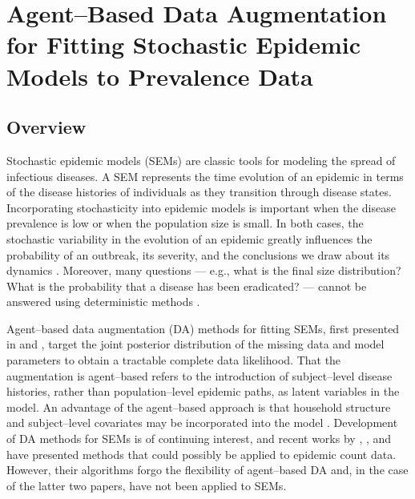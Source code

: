 \chapter{Agent--Based Data Augmentation for Fitting Stochastic Epidemic Models to Prevalence Data}
\label{chap:bda_for_fitting_sems_to_prevalence_data}

\section{Overview}
\label{sec:bda_overview}

Stochastic epidemic models (SEMs) are classic tools for modeling the spread of infectious diseases. A SEM represents the time evolution of an epidemic in terms of the disease histories of individuals as they transition through disease states. Incorporating stochasticity into epidemic models is important when the disease prevalence is low or when the population size is small. In both cases, the stochastic variability in the evolution of an epidemic greatly influences the probability of an outbreak, its severity, and the conclusions we draw about its dynamics \cite{allen2008introduction,keeling2008}. Moreover, many questions --- e.g., what is the final size distribution? What is the probability that a disease has been eradicated? --- cannot be answered using deterministic methods \cite{britton2010}.

Agent--based data augmentation (DA) methods for fitting SEMs, first presented in \cite{gibson1998} and \cite{oneill1999}, target the joint posterior distribution of the missing data and model parameters to obtain a tractable complete data likelihood. That the augmentation is agent--based refers to the introduction of subject--level disease histories, rather than population--level epidemic paths, as latent variables in the model. An advantage of the agent--based approach is that household structure and subject--level covariates may be incorporated into the model \cite{auranen2000,hohle2002,cauchemez2004bayesian, neal2004statistical,oneill2009}. Development of DA methods for SEMs is of continuing interest, and recent works by \cite{pooley2015}, \cite{QinShe15}, and \cite{shestopaloff2016sampling} have presented methods that could possibly be applied to epidemic count data. However, their algorithms forgo the flexibility of agent--based DA and, in the case of the latter two papers, have not been applied to SEMs.

